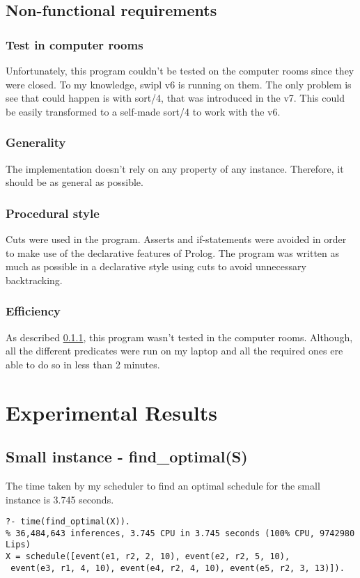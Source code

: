 \documentclass[a4paper]{article}
\begin{document}
\subsection{Non-functional requirements}
\subsubsection{Test in computer rooms}\label{test}
Unfortunately, this program couldn't be tested on the computer rooms since they were closed. To my knowledge, swipl v6 is running on them. The only problem is see that could happen is with sort/4, that was introduced in the v7. This could be easily transformed to a self-made sort/4 to work with the v6.

\subsubsection{Generality}
The implementation doesn't rely on any property of any instance. Therefore, it should be as general as possible. 


\subsubsection{Procedural style}
Cuts were used in the program. Asserts and if-statements were avoided in order to make use of the declarative features of Prolog. The program was written as much as possible in a declarative style using cuts to avoid unnecessary backtracking.


\subsubsection{Efficiency}
As described \ref{test}, this program wasn't tested in the computer rooms. Although, all the different predicates were run on my laptop and all the required ones ere able to do so in less than 2 minutes.
\pagebreak
\section{Experimental Results}
\subsection{Small instance - find\_optimal(\-S)}
The time taken by my scheduler to find an optimal schedule for the small instance is 3.745 seconds.
\begin{lstlisting}[style=Linux]
?- time(find_optimal(X)).
% 36,484,643 inferences, 3.745 CPU in 3.745 seconds (100% CPU, 9742980 Lips)
X = schedule([event(e1, r2, 2, 10), event(e2, r2, 5, 10),
 event(e3, r1, 4, 10), event(e4, r2, 4, 10), event(e5, r2, 3, 13)]).
\end{lstlisting}
\end{document}
